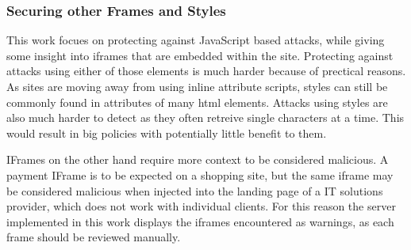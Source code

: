 \subsubsection{Securing other Frames and Styles}

This work focues on protecting against JavaScript based attacks, while giving some insight into iframes that are embedded within the site.
Protecting against attacks using either of those elements is much harder because of prectical reasons.
As sites are moving away from using inline attribute scripts, styles can still be commonly found in attributes of many html elements.
Attacks using styles are also much harder to detect as they often retreive single characters at a time.
This would result in big policies with potentially little benefit to them.

IFrames on the other hand require more context to be considered malicious.
A payment IFrame is to be expected on a shopping site, but the same iframe may be considered malicious when injected into the landing page of a IT solutions provider, which does not work with individual clients.
For this reason the server implemented in this work displays the iframes encountered as warnings, as each frame should be reviewed manually.


